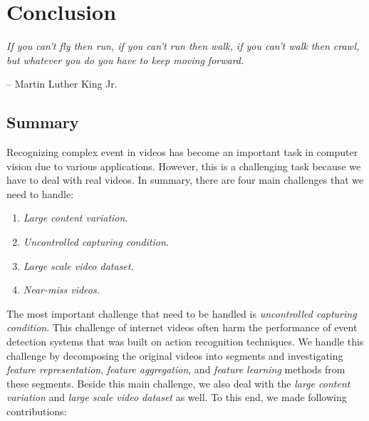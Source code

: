 \chapter{Conclusion}
\label{chapter6}

\epigraph{\textit{If you can't fly then run, if you can't run then walk, if you can't walk then crawl, but whatever you do you have to keep moving forward.}}{ -- Martin Luther King Jr.}

\ifpdf
    \graphicspath{{Chapter6/Figs/Raster/}{Chapter6/Figs/PDF/}{Chapter6/Figs/}}
\else
    \graphicspath{{Chapter6/Figs/Vector/}{Chapter6/Figs/}}
\fi

\section{Summary}

Recognizing complex event in videos has become an important task in computer vision due to various applications. However, this is a challenging task because we have to deal with real videos. In summary, there are four main challenges that we need to handle:
\begin{enumerate}
	\itemsep0em 
	\item \textit{Large content variation}.
	\item \textit{Uncontrolled capturing condition.}
	\item \textit{Large scale video dataset.}	
	\item \textit{Near-miss videos.}
\end{enumerate}
	
  The most important challenge that need to be handled is \textit{uncontrolled capturing condition}. This challenge of internet videos often harm the performance of event detection systems that was built on action recognition techniques. We handle this challenge by decomposing the original videos into segments and investigating \textit{feature representation}, \textit{feature aggregation}, and \textit{feature learning} methods from these segments. Beside this main challenge, we also deal with the \textit{large content variation} and \textit{large scale video dataset} as well. To this end, we made following contributions:


